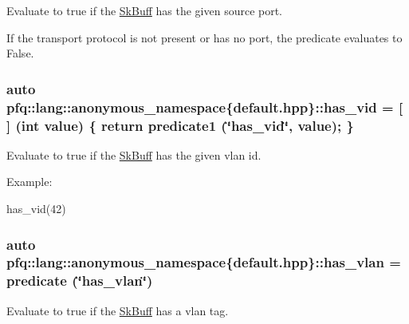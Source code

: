 Evaluate to {\ttfamily true} if the \hyperlink{structpfq_1_1lang_1_1SkBuff}{Sk\+Buff} has the given source port. 

If the transport protocol is not present or has no port, the predicate evaluates to False. \hypertarget{namespacepfq_1_1lang_1_1anonymous__namespace_02default_8hpp_03_a99c204d8095fdccd50d4cb24d32e5b5b}{
\subsubsection[{has\+\_\+vid}]{\setlength{\rightskip}{0pt plus 5cm}auto pfq\+::lang\+::anonymous\+\_\+namespace\{default.\+hpp\}\+::has\+\_\+vid = \mbox{[}$\,$\mbox{]} (int value) \{ return {\bf predicate1} (\char`\"{}has\+\_\+vid\char`\"{}, value); \}}}\label{namespacepfq_1_1lang_1_1anonymous__namespace_02default_8hpp_03_a99c204d8095fdccd50d4cb24d32e5b5b}


Evaluate to {\ttfamily true} if the \hyperlink{structpfq_1_1lang_1_1SkBuff}{Sk\+Buff} has the given vlan id. 

Example\+:

has\+\_\+vid(42) \hypertarget{namespacepfq_1_1lang_1_1anonymous__namespace_02default_8hpp_03_a1f0378ddfa90777d11ffae5fbb57b4e0}{
\subsubsection[{has\+\_\+vlan}]{\setlength{\rightskip}{0pt plus 5cm}auto pfq\+::lang\+::anonymous\+\_\+namespace\{default.\+hpp\}\+::has\+\_\+vlan = {\bf predicate} (\char`\"{}has\+\_\+vlan\char`\"{})}}\label{namespacepfq_1_1lang_1_1anonymous__namespace_02default_8hpp_03_a1f0378ddfa90777d11ffae5fbb57b4e0}


Evaluate to {\ttfamily true} if the \hyperlink{structpfq_1_1lang_1_1SkBuff}{Sk\+Buff} has a vlan tag. 

